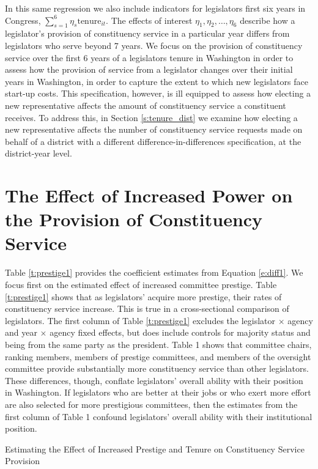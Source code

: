 \documentclass[12pt]{article}
\begin{document}
In this same regression we also include indicators for legislators first six years in Congress, $ \sum_{s = 1}^{6} \eta_{s} \text{tenure}_{it}$. The effects of interest $\eta_{1}, \eta_{2}, \hdots, \eta_{6}$ describe how a legislator's provision of constituency service in a particular year differs from legislators who serve beyond 7 years. We focus on the provision of constituency service over the first 6 years of a legislators tenure in Washington in order to assess how the provision of service from a legislator changes over their initial years in Washington, in order to capture the extent to which new legislators face start-up costs. This specification, however, is ill equipped to assess how electing a new representative affects the amount of constituency service a constituent receives. To address this, in Section \ref{s:tenure_dist} we examine how electing a new representative affects the number of constituency service requests made on behalf of a district with a different difference-in-differences specification, at the district-year level.   

\section{The Effect of Increased Power on the Provision of Constituency Service}
Table \ref{t:prestige1} provides the coefficient estimates from Equation \ref{e:diff1}. We focus first on the estimated effect of increased committee prestige. Table \ref{t:prestige1} shows that as legislators' acquire more prestige, their rates of constituency service increase. This is true in a cross-sectional comparison of legislators. The first column of Table \ref{t:prestige1} excludes the legislator $\times$ agency and year $\times$ agency fixed effects, but does include controls for majority status and being from the same party as the president. Table 1 shows that committee chairs, ranking members, members of prestige committees, and members of the oversight committee provide substantially more constituency service than other legislators. These differences, though, conflate legislators' overall ability with their position in Washington. If legislators who are better at their jobs or who exert more effort are also selected for more prestigious committees, then the estimates from the first column of Table 1 confound legislators' overall ability with their institutional position.   


\begin{table}[hbt!]
\caption{Estimating the Effect of Increased Prestige and Tenure on Constituency Service Provision} \label{t:prestige1}

\begin{minipage}{\textwidth}
\begin{center}

\end{center}
\end{minipage}
\end{table}
\end{document}
